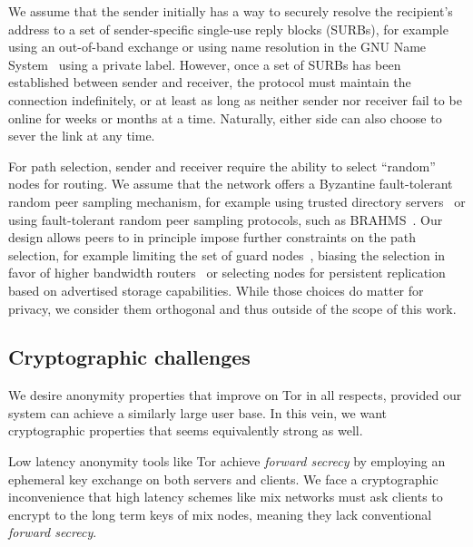 We assume that the sender initially has a way to securely resolve the
recipient's address to a set of sender-specific single-use reply
blocks (SURBs), for example using an out-of-band exchange or using
name resolution in the GNU Name System~\cite{gns} using a private
label.  However, once a set of SURBs has been established between
sender and receiver, the protocol must maintain the connection
indefinitely, or at least as long as neither sender nor receiver fail
to be online for weeks or months at a time.  Naturally, either side
can also choose to sever the link at any time.

For path selection, sender and receiver require the ability to select
``random'' nodes for routing.  We assume that the network offers a
Byzantine fault-tolerant random peer sampling mechanism, for example
using trusted directory servers~\cite{tordir} or using fault-tolerant
random peer sampling protocols, such as BRAHMS~\cite{brahms}.  Our
design allows peers to in principle impose further constraints on the
path selection, for example limiting the set of guard
nodes~\cite{oneguardisenough}, biasing the selection in favor of
higher bandwidth routers~\cite{findexample} or selecting nodes for
persistent replication based on advertised storage capabilities.
While those choices do matter for privacy, we consider them orthogonal
and thus outside of the scope of this work.

\subsection{Cryptographic challenges}\label{subsec:challenges}

We desire anonymity properties that improve on Tor in all respects,
provided our system can achieve a similarly large user base.  In this
vein, we want cryptographic properties that seems equivalently strong
as well.

Low latency anonymity tools like Tor achieve {\em forward secrecy}
by employing an ephemeral key exchange on both servers and clients.
We face a cryptographic inconvenience that high latency schemes
like mix networks must ask clients to encrypt to the long term keys
of mix nodes, meaning they lack conventional {\em forward secrecy}.  

